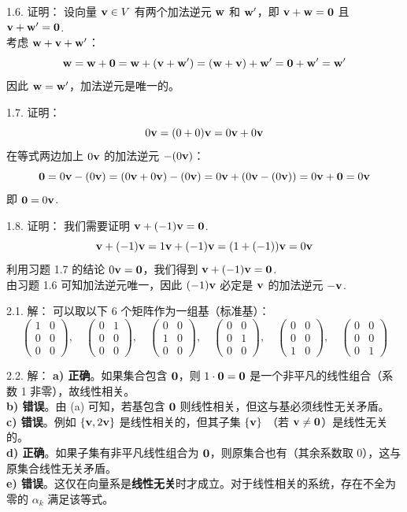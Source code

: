 \begin{exer}
1.6. 证明：
设向量 $\mathbf{v} \in V$ 有两个加法逆元 $\mathbf{w}$ 和 $\mathbf{w}'$，即 $\mathbf{v} + \mathbf{w} = \mathbf{0}$ 且 $\mathbf{v} + \mathbf{w}' = \mathbf{0}$.~
\\
考虑 $\mathbf{w} + \mathbf{v} + \mathbf{w}'$：
$$
\mathbf{w} = \mathbf{w} + \mathbf{0} = \mathbf{w} + (\mathbf{v} + \mathbf{w}') = (\mathbf{w} + \mathbf{v}) + \mathbf{w}' = \mathbf{0} + \mathbf{w}' = \mathbf{w}'
$$
因此 $\mathbf{w} = \mathbf{w}'$，加法逆元是唯一的。

1.7. 证明：
$$
0\mathbf{v} = (0 + 0)\mathbf{v} = 0\mathbf{v} + 0\mathbf{v}
$$
在等式两边加上 $0\mathbf{v}$ 的加法逆元 $-(0\mathbf{v})$：
$$
\mathbf{0} = 0\mathbf{v}  -(0\mathbf{v}) = (0\mathbf{v} + 0\mathbf{v})  -(0\mathbf{v}) = 0\mathbf{v} + (0\mathbf{v}  -(0\mathbf{v})) = 0\mathbf{v} + \mathbf{0} = 0\mathbf{v}
$$
即 $\mathbf{0} = 0\mathbf{v}$.~

1.8. 证明：
我们需要证明 $\mathbf{v} + (-1)\mathbf{v} = \mathbf{0}$.~
$$
\mathbf{v} + (-1)\mathbf{v} = 1\mathbf{v} + (-1)\mathbf{v} = (1 + (-1))\mathbf{v} = 0\mathbf{v}
$$
利用习题 1.7 的结论 $0\mathbf{v} = \mathbf{0}$，我们得到 $\mathbf{v} + (-1)\mathbf{v} = \mathbf{0}$.~
\\
由习题 1.6 可知加法逆元唯一，因此 $(-1)\mathbf{v}$ 必定是 $\mathbf{v}$ 的加法逆元 $-\mathbf{v}$.~

\vspace{5ex}


2.1. 解：
可以取以下 6 个矩阵作为一组基（标准基）：
$$
\begin{pmatrix} 1 & 0 \\ 0 & 0 \\ 0 & 0 \end{pmatrix}, \quad
\begin{pmatrix} 0 & 1 \\ 0 & 0 \\ 0 & 0 \end{pmatrix}, \quad
\begin{pmatrix} 0 & 0 \\ 1 & 0 \\ 0 & 0 \end{pmatrix}, \quad
\begin{pmatrix} 0 & 0 \\ 0 & 1 \\ 0 & 0 \end{pmatrix}, \quad
\begin{pmatrix} 0 & 0 \\ 0 & 0 \\ 1 & 0 \end{pmatrix}, \quad
\begin{pmatrix} 0 & 0 \\ 0 & 0 \\ 0 & 1 \end{pmatrix}
$$

2.2. 解：
\textbf{a) 正确}。如果集合包含 $\mathbf{0}$，则 $1 \cdot \mathbf{0} = \mathbf{0}$ 是一个非平凡的线性组合（系数 1 非零），故线性相关。
\\
\textbf{b) 错误}。由 (a) 可知，若基包含 $\mathbf{0}$ 则线性相关，但这与基必须线性无关矛盾。
\\
\textbf{c) 错误}。例如 $\{\mathbf{v}, 2\mathbf{v}\}$ 是线性相关的，但其子集 $\{\mathbf{v}\}$ （若 $\mathbf{v} \neq \mathbf{0}$）是线性无关的。
\\
\textbf{d) 正确}。如果子集有非平凡线性组合为 $\mathbf{0}$，则原集合也有（其余系数取 0），这与原集合线性无关矛盾。
\\
\textbf{e) 错误}。这仅在向量系是\textbf{线性无关}时才成立。对于线性相关的系统，存在不全为零的 $\alpha_k$ 满足该等式。


\end{exer}
